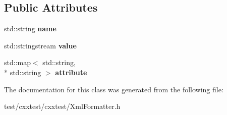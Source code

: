 \subsection*{Public Attributes}
\begin{DoxyCompactItemize}
\item 
\hypertarget{classCxxTest_1_1ElementInfo_a168065b70d5784d05560ce2fb7163356}{std\-::string {\bfseries name}}\label{classCxxTest_1_1ElementInfo_a168065b70d5784d05560ce2fb7163356}

\item 
\hypertarget{classCxxTest_1_1ElementInfo_a080e05f851a2f0a6c56f3b8e9c77b8e2}{std\-::stringstream {\bfseries value}}\label{classCxxTest_1_1ElementInfo_a080e05f851a2f0a6c56f3b8e9c77b8e2}

\item 
\hypertarget{classCxxTest_1_1ElementInfo_a4e81871282b9dbe53a6b6493c6d53c6f}{std\-::map$<$ std\-::string, \\*
std\-::string $>$ {\bfseries attribute}}\label{classCxxTest_1_1ElementInfo_a4e81871282b9dbe53a6b6493c6d53c6f}

\end{DoxyCompactItemize}


The documentation for this class was generated from the following file\-:\begin{DoxyCompactItemize}
\item 
test/cxxtest/cxxtest/Xml\-Formatter.\-h\end{DoxyCompactItemize}

